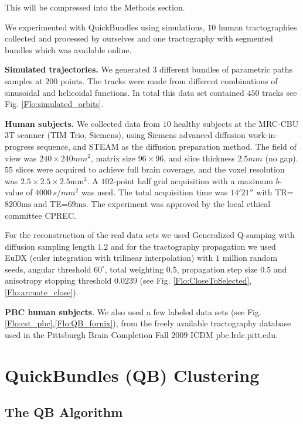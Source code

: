 \documentclass[preprint,authoryear,a4paper,10pt,onecolumn]{elsarticle}
\begin{document}
This will be compressed into the Methods section.

We experimented with QuickBundles using simulations, $10$ human
tractographies collected and processed by ourselves and one tractography
with segmented bundles which was available online.

\textbf{Simulated trajectories.} We generated $3$ different bundles of
parametric paths samples at $200$ points. The tracks were made from
different combinations of sinusoidal and helicoidal functions.  In total
this data set contained $450$ tracks see Fig. \ref{Flo:simulated_orbits}.

\textbf{Human subjects. }We collected data from $10$ healthy subjects at
the MRC-CBU 3T scanner (TIM Trio, Siemens), using Siemens advanced
diffusion work-in-progress sequence, and STEAM
\cite{merboldt1992diffusion,MAB04} as the diffusion preparation
method. The field of view was $240\times240mm^{2}$, matrix size
$96\times96$, and slice thickness $2.5mm$ (no gap).  $55$ slices were
acquired to achieve full brain coverage, and the voxel resolution was
$2.5\times2.5\times2.5\textrm{mm}{}^{3}$. A $102$-point half grid
acquisition\cite{Yeh2010} with a maximum $b$-value of $4000\, s/mm^{2}$
was used. The total acquisition time was $14'21''$ with
TR=$8200\textrm{ms}$ and TE=$69\textrm{ms}$. The experiment was approved
by the local ethical committee CPREC.

For the reconstruction of the real data sets we used Generalized
Q-samping with diffusion sampling length $1.2$ and for the tractography
propagation we used EuDX (euler integration with trilinear
interpolation) with $1$ million random seeds, angular threshold
$60^{\circ}$, total weighting $0.5$, propagation step size $0.5$ and
anisotropy stopping threshold $0.0239$ (see
Fig. \ref{Flo:CloseToSelected},\ref{Flo:arcuate_close}).

\textbf{PBC human subjects}. We also used a few labeled data sets (see
Fig.\ref{Flo:cst_pbc},\ref{Flo:QB_fornix}), from the freely available
tractography database used in the Pittsburgh Brain Completion Fall
$2009$ ICDM pbc.lrdc.pitt.edu.

\section{QuickBundles (QB) Clustering}

\subsection{The QB Algorithm}
\end{document}
